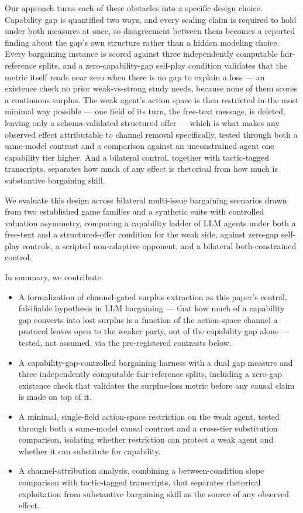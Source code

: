 \documentclass[11pt]{article}
\begin{document}
Our approach turns each of these obstacles into a specific design choice. Capability gap is quantified two ways, and every scaling claim is required to hold under both measures at once, so disagreement between them becomes a reported finding about the gap's own structure rather than a hidden modeling choice. Every bargaining instance is scored against three independently computable fair-reference splits, and a zero-capability-gap self-play condition validates that the metric itself reads near zero when there is no gap to explain a loss --- an existence check no prior weak-vs-strong study needs, because none of them scores a continuous surplus. The weak agent's action space is then restricted in the most minimal way possible --- one field of its turn, the free-text message, is deleted, leaving only a schema-validated structured offer --- which is what makes any observed effect attributable to channel removal specifically, tested through both a same-model contrast and a comparison against an unconstrained agent one capability tier higher. And a bilateral control, together with tactic-tagged transcripts, separates how much of any effect is rhetorical from how much is substantive bargaining skill.

We evaluate this design across bilateral multi-issue bargaining scenarios drawn from two established game families and a synthetic suite with controlled valuation asymmetry, comparing a capability ladder of LLM agents under both a free-text and a structured-offer condition for the weak side, against zero-gap self-play controls, a scripted non-adaptive opponent, and a bilateral both-constrained control.

In summary, we contribute:
\begin{itemize}[leftmargin=1.4em]
\item A formalization of channel-gated surplus extraction as this paper's central, falsifiable hypothesis in LLM bargaining --- that how much of a capability gap converts into lost surplus is a function of the action-space channel a protocol leaves open to the weaker party, not of the capability gap alone --- tested, not assumed, via the pre-registered contrasts below.
\item A capability-gap-controlled bargaining harness with a dual gap measure and three independently computable fair-reference splits, including a zero-gap existence check that validates the surplus-loss metric before any causal claim is made on top of it.
\item A minimal, single-field action-space restriction on the weak agent, tested through both a same-model causal contrast and a cross-tier substitution comparison, isolating whether restriction can protect a weak agent and whether it can substitute for capability.
\item A channel-attribution analysis, combining a between-condition slope comparison with tactic-tagged transcripts, that separates rhetorical exploitation from substantive bargaining skill as the source of any observed effect.
\end{itemize}
\end{document}
